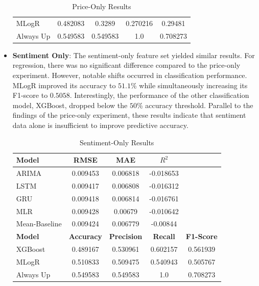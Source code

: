 \documentclass[Master,english,IEEE]{twbook}
\begin{document}
\begin{itemize}
\begin{table}[H]
\begin{tabular}{|lcccc|}
        MLogR          & 0.482083      & 0.3289       & 0.270216       & 0.29481  \\
        Always Up      & 0.549583      & 0.549583     & 1.0            & 0.708273 \\
        \hline
    \end{tabular}
    \caption{Price-Only Results}
    \label{tab:price_only_results}
    \end{table}
    \item \textbf{Sentiment Only}: The sentiment-only feature set yielded similar results. For regression, there was no significant difference compared to the price-only experiment. However, notable shifts occurred in classification performance. MLogR improved its accuracy to $51.1$\% while simultaneously increasing its F1-score to $0.5058$. Interestingly, the performance of the other classification model, XGBoost, dropped below the $50$\% accuracy threshold. Parallel to the findings of the price-only experiment, these results indicate that sentiment data alone is insufficient to improve predictive accuracy.
    \begin{table}[H]
    \centering
    \small %
    \setlength{\tabcolsep}{4pt} %
    \begin{tabular}{|lcccc|}
        \hline
        \textbf{Model} & \textbf{RMSE} & \textbf{MAE} & \textbf{$R^2$} & \\
        \hline
        ARIMA          & 0.009453      & 0.006818     & -0.018653      & \\
        LSTM           & 0.009417      & 0.006808     & -0.016312      & \\
        GRU            & 0.009418      & 0.006814     & -0.016761      & \\
        MLR            & 0.009428      & 0.00679      & -0.010642      & \\
        Mean-Baseline  & 0.009424      & 0.006779     & -0.00844       & \\
        \hline
        \textbf{Model} & \textbf{Accuracy} & \textbf{Precision} & \textbf{Recall} & \textbf{F1-Score} \\
        \hline
        XGBoost        & 0.489167      & 0.530961     & 0.602157       & 0.561939 \\
        MLogR          & 0.510833      & 0.509475     & 0.540943       & 0.505767 \\
        Always Up      & 0.549583      & 0.549583     & 1.0            & 0.708273 \\
        \hline
    \end{tabular}
    \caption{Sentiment-Only Results}
    \label{tab:res_sent_only}
    \end{table}


\end{itemize}
\end{document}

